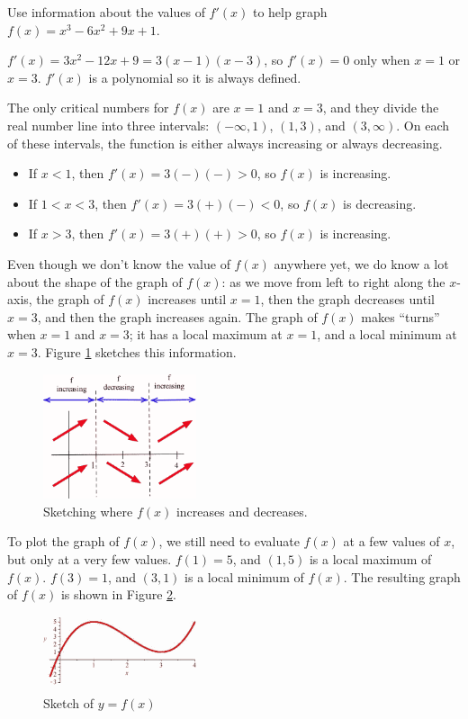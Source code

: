 \begin{example}
Use information about the values of $f'(x)$ to help graph $f(x)=x^3-6x^2+9x+1$.

\begin{solution} $f'(x)=3x^2-12x+9=3(x-1)(x-3)$, so $f'(x)=0$ only when $x=1$ or $x=3$. $f'(x)$ is a polynomial so it is always defined.

The only critical numbers for $f(x)$ are $x=1$ and $x=3$, and they divide the real number line into three intervals: $(-\infty,1)$, $(1,3)$, and $(3,\infty)$. On each of these intervals, the function is either always increasing or always decreasing.
    \begin{itemize}[label={}]
    \item If $x<1$, then $f'(x)= 3(-)(-)>0$, so $f(x)$ is increasing.
    \item If $1<x<3$, then $f'(x)= 3(+)(-) <0$, so $f(x)$ is decreasing.
    \item If $x>3$, then $f'(x)= 3(+)(+) >0$, so $f(x)$ is increasing.
    \end{itemize}
Even though we don't know the value of $f(x)$ anywhere yet, we do know a lot about the shape of the graph of $f(x)$: as we move from left to right along the $x$-axis, the graph of $f(x)$ increases until $x=1$, then the graph decreases until $x=3$, and then the graph increases again. The graph of $f(x)$ makes ``turns'' when $x=1$ and $x=3$; it has a local maximum at $x=1$, and a local minimum at $x=3$. Figure \ref{fig:3-5-signs} sketches this information.

\begin{figure}[!ht]
  \centering
    \includegraphics[width=0.4\textwidth]{img/chap3/image075.png}
    \caption{Sketching where $f(x)$ increases and decreases.}
    \label{fig:3-5-signs}
\end{figure}
To plot the graph of $f(x)$, we still need to evaluate $f(x)$ at a few values of $x$, but only at a very few values. $f(1)=5$, and $(1,5)$ is a local maximum of $f(x)$. $f(3)=1$, and $(3,1)$ is a local minimum of $f(x)$. The resulting graph of $f(x)$ is shown in Figure \ref{fig:3-5-fx}.

\begin{figure}[!ht]
  \centering
    \includegraphics[width=0.4\textwidth]{img/chap3/image076.png}
    \caption{Sketch of $y=f(x)$}
    \label{fig:3-5-fx}
\end{figure}
\end{solution}\end{example}

